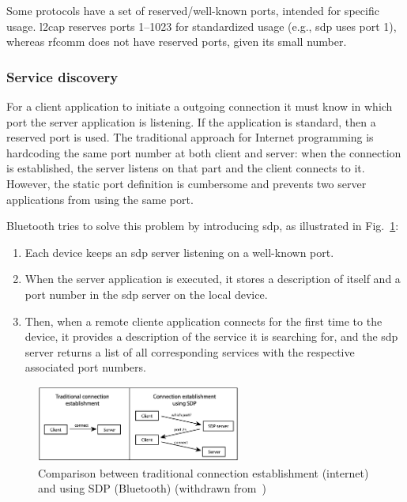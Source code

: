 Some protocols have a set of reserved/well-known ports, intended for
specific usage. \gls{l2cap} reserves ports 1--1023
for standardized usage (e.g., \gls{sdp} uses port 1), whereas \gls{rfcomm} does
not have reserved ports, given its small number.
\subsubsection{Service discovery}%
\label{sec:bt-service-discovery}
%
For a client application to initiate a outgoing connection it must know in which
port the server application is listening. If the application is standard, then a
reserved port is used. The traditional approach for Internet programming is
hardcoding the same port number at both client and server: when the connection
is established, the server listens on that part and the client connects to
it. However, the static port definition is cumbersome and prevents two server
applications from using the same port.

Bluetooth tries to solve this problem by introducing \gls{sdp}, as illustrated
in Fig.~\ref{fig:bt-sdp-operation}:
\begin{enumerate}
\item Each device keeps an \gls{sdp} server listening on a well-known port.
\item When the server application is executed, it stores a description of itself
  and a port number in the \gls{sdp} server on the local device.
\item Then, when a remote cliente application connects for the first time to the
  device, it provides a description of the service it is searching for, and the
  \gls{sdp} server returns a list of all corresponding services with the
  respective associated port numbers.
\end{enumerate}
\begin{figure}[!hbt]
\centering
    \includegraphics[width=0.6\textwidth]{./img/bt-sdp-operation.png}
  \caption{Comparison between traditional connection establishment (internet)
    and using SDP (Bluetooth) (withdrawn from~\cite{huang2007bluetooth})}%
\label{fig:bt-sdp-operation}
\end{figure}
